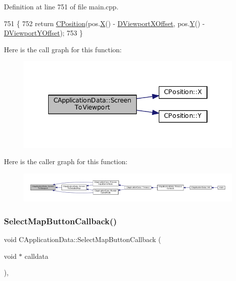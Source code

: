 Definition at line 751 of file main.\+cpp.


\begin{DoxyCode}
751                                                                 \{
752     \textcolor{keywordflow}{return} \hyperlink{classCPosition}{CPosition}(pos.\hyperlink{classCPosition_a9a6b94d3b91df1492d166d9964c865fc}{X}() - \hyperlink{classCApplicationData_a306bba873ccc47126111305fe21ef3ff}{DViewportXOffset}, pos.\hyperlink{classCPosition_a1aa8a30e2f08dda1f797736ba8c13a87}{Y}() - 
      \hyperlink{classCApplicationData_afc58ed96a1af813b28f6abf2c7d2dc72}{DViewportYOffset});
753 \}
\end{DoxyCode}
Here is the call graph for this function\+:\nopagebreak
\begin{figure}[H]
\begin{center}
\leavevmode
\includegraphics[width=334pt]{classCApplicationData_aebd3ae4cfd74962413024f1649233f08_cgraph}
\end{center}
\end{figure}
Here is the caller graph for this function\+:\nopagebreak
\begin{figure}[H]
\begin{center}
\leavevmode
\includegraphics[width=350pt]{classCApplicationData_aebd3ae4cfd74962413024f1649233f08_icgraph}
\end{center}
\end{figure}
\hypertarget{classCApplicationData_a5f915dc03205b67ca79f4dcfd7b43f5a}{}\label{classCApplicationData_a5f915dc03205b67ca79f4dcfd7b43f5a} 
\subsubsection{\texorpdfstring{Select\+Map\+Button\+Callback()}{SelectMapButtonCallback()}}
{\footnotesize\ttfamily void C\+Application\+Data\+::\+Select\+Map\+Button\+Callback (\begin{DoxyParamCaption}\item[{void $\ast$}]{calldata }\end{DoxyParamCaption})\hspace{0.3cm}{\ttfamily [static]}, {\ttfamily [protected]}}



